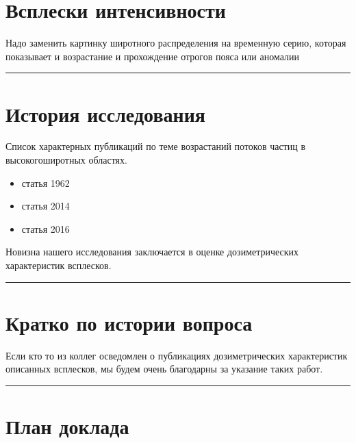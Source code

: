 \documentclass[]{article}
\date{}
\begin{document}
\section{Всплески интенсивности}\label{header-n0}

Надо заменить картинку широтного распределения на временную серию,
которая показывает и возрастание и прохождение отрогов пояса или
аномалии

\begin{center}\rule{0.5\linewidth}{\linethickness}\end{center}

\section{История исследования}\label{header-n6}

Список характерных публикаций по теме возрастаний потоков частиц в
высокогоширотных областях.

\begin{itemize}
\item
  статья 1962
\item
  статья 2014
\item
  статья 2016
\end{itemize}

Новизна нашего исследования заключается в оценке дозиметрических
характеристик всплесков.

\begin{center}\rule{0.5\linewidth}{\linethickness}\end{center}

\section{Кратко по истории вопроса}\label{header-n22}

Если кто то из коллег осведомлен о публикациях дозиметрических
характеристик описанных всплесков, мы будем очень благодарны за указание
таких работ.

\begin{center}\rule{0.5\linewidth}{\linethickness}\end{center}

\section{План доклада}\label{header-n26}
\end{document}
